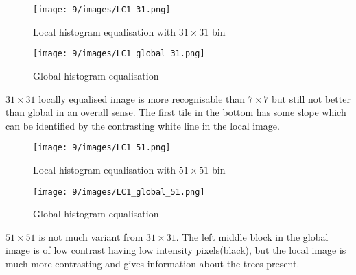 \documentclass[12pt]{article}
\begin{document}
\begin{itemize}
    \begin{figure}[H]
        \centering
        \begin{minipage}{.45\textwidth}
          \centering
          \texttt{[image: 9/images/LC1\_31.png]}
          \caption*{Local histogram equalisation with $31\times 31$ bin}
          \label{fig:totalpowervst}
        \end{minipage}
        \begin{minipage}{.45\textwidth}
          \centering
          \texttt{[image: 9/images/LC1\_global\_31.png]}
          \caption*{Global histogram equalisation}
          \label{fig:totalpower2}
        \end{minipage}
        \label{fig:totalPower}
    \end{figure}
    $31\times 31$ locally equalised image is more recognisable than $7\times 7$ but still not better than global in an overall sense. The first tile in the bottom has some slope which can be identified by the contrasting white line in the local image.
    
    \begin{figure}[H]
        \centering
        \begin{minipage}{.45\textwidth}
          \centering
          \texttt{[image: 9/images/LC1\_51.png]}
          \caption*{Local histogram equalisation with $51\times 51$ bin}
          \label{fig:totalpowervst}
        \end{minipage}
        \begin{minipage}{.45\textwidth}
          \centering
          \texttt{[image: 9/images/LC1\_global\_51.png]}
          \caption*{Global histogram equalisation}
          \label{fig:totalpower2}
        \end{minipage}
        \label{fig:totalPower}
    \end{figure}
    $51\times 51$ is not much variant from $31\times 31$. The left middle block in the global image is of low contrast having low intensity pixels(black), but the local image is much more contrasting and gives information about the trees present.
    
    

\end{itemize}
\end{document}
